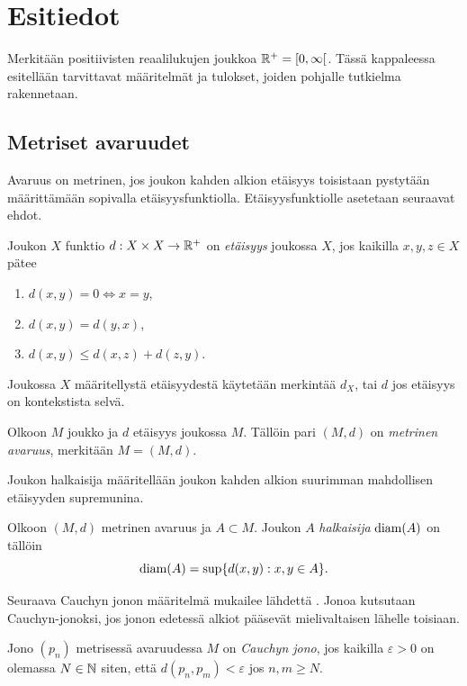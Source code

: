 \documentclass[12pt,oneside,a4paper]{amsbook} %
\begin{document}
\chapter{Esitiedot}
Merkitään positiivisten reaalilukujen joukkoa ${\mathbb{R}^{+}} = [0, \infty[$. Tässä kappaleessa esitellään tarvittavat määritelmät ja tulokset, joiden pohjalle tutkielma rakennetaan. 
\section{Metriset avaruudet}

Avaruus on metrinen, jos joukon kahden alkion etäisyys toisistaan pystytään määrittämään sopivalla etäisyysfunktiolla. Etäisyysfunktiolle asetetaan seuraavat ehdot.

\begin{definition}
    Joukon $X$ funktio $d: X\times X \to \mathbb{R}^+$ on \textit{etäisyys} joukossa $X$, jos kaikilla $x, y, z \in X$ pätee
    \begin{enumerate}
        \item $d(x,y) = 0 \iff x = y$,
        \item $d(x,y) = d(y,x)$,
        \item $d(x,y) \le d(x,z) + d(z,y)$.
    \end{enumerate}
    Joukossa $X$ määritellystä etäisyydestä käytetään merkintää $d_X$, tai $d$ jos etäisyys on kontekstista selvä. 
\end{definition}

\begin{definition}
    Olkoon $M$ joukko ja $d$ etäisyys joukossa $M$. Tällöin pari $(M, d)$ on \textit{metrinen avaruus}, merkitään $M = (M, d)$.
\end{definition}

Joukon halkaisija määritellään joukon kahden alkion suurimman mahdollisen etäisyyden supremunina.
\begin{definition}
    Olkoon $(M, d)$ metrinen avaruus ja $A \subset M$. Joukon $A$ \textit{halkaisija} $\operatorname{diam}(A)$ on
    tällöin
    \begin{equation*}
        \operatorname{diam}(A) = \sup\{d(x, y) : x,y \in A\}.
    \end{equation*}
\end{definition}
Seuraava Cauchyn jonon määritelmä mukailee lähdettä  \cite[s. 52]{rudin}. Jonoa kutsutaan Cauchyn-jonoksi, jos jonon edetessä alkiot pääsevät mielivaltaisen lähelle toisiaan.

\begin{definition}
    Jono $(p_n)$ metrisessä avaruudessa $M$ on \textit{Cauchyn jono}, jos kaikilla $\varepsilon > 0$ on olemassa $N\in \mathbf{\mathbb{N}}$ siten, että $d(p_n, p_m) < \varepsilon$ jos $n, m\ge N$.
\end{definition}
\end{document}
